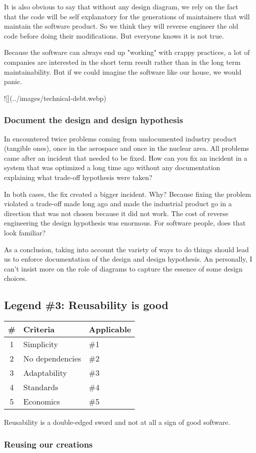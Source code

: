 \documentclass[]{article}
\newcommand{\criterias}[5]
{\begin{tabular}{|c|l|l|}
\textbf{\#} & \textbf{Criteria} & \textbf{Applicable} \\
\hline
1 & Simplicity      & \#1 \\
2 & No dependencies & \#2 \\
3 & Adaptability    & \#3 \\
4 & Standards       & \#4 \\
5 & Economics       & \#5 \\
\end{tabular}}
\begin{document}
It is also obvious to say that without any design diagram, we rely on the fact that the code will be self explanatory for the generations of maintainers that will maintain the software product. So we think they will reverse engineer the old code before doing their modifications. But everyone knows it is not true.

Because the software can always end up "working" with crappy practices, a lot of companies are interested in the short term result rather than in the long term maintainability. But if we could imagine the software like our house, we would panic.

![](../images/technical-debt.webp)

\subsubsection{Document the design and design hypothesis}

In encountered twice problems coming from undocumented industry product (tangible ones), once in the aerospace and once in the nuclear area. All problems came after an incident that needed to be fixed. How can you fix an incident in a system that was optimized a long time ago without any documentation explaining what trade-off hypothesis were taken?

In both cases, the fix created a bigger incident. Why? Because fixing the problem violated a trade-off made long ago and made the industrial product go in a direction that was not chosen because it did not work. The cost of reverse engineering the design hypothesis was enormous. For software people, does that look familiar?

As a conclusion, taking into account the variety of ways to do things should lead us to enforce documentation of the design and design hypothesis. An personally, I can't insist more on the role of diagrams to capture the essence of some design choices.

\subsection{Legend \#3: Reusability is good}

\criterias{Yes}{Yes}{Yes}{Yes}{Yes}

Reusability is a double-edged sword and not at all a sign of good software.

\subsubsection{Reusing our creations}
\end{document}
